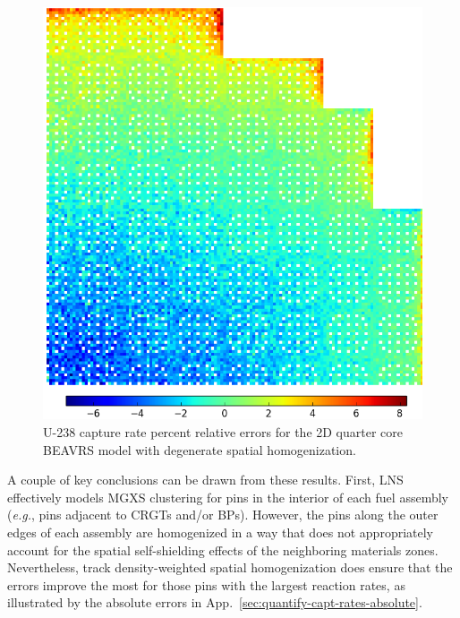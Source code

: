 \begin{figure}[h!]
\centering
\includegraphics[width=\linewidth]{figures/patterns/lns/full-core/capt-err-degenerate}
\vspace{2mm}
\caption[U-238 capture rate errors for \ac{BEAVRS} with degenerate homogenization]{U-238 capture rate percent relative errors for the 2D quarter core \ac{BEAVRS} model with degenerate spatial homogenization.}
\label{fig:chap9-full-core-capt-err-degenerate}
\end{figure}

\clearpage

A couple of key conclusions can be drawn from these results. First, \ac{LNS} effectively models \ac{MGXS} clustering for pins in the interior of each fuel assembly (\textit{e.g.}, pins adjacent to \acp{CRGT} and/or \acp{BP}). However, the pins along the outer edges of each assembly are homogenized in a way that does not appropriately account for the spatial self-shielding effects of the neighboring materials zones. Nevertheless, track density-weighted spatial homogenization does ensure that the errors improve the most for those pins with the largest reaction rates, as illustrated by the absolute errors in App.~\ref{sec:quantify-capt-rates-absolute}.

